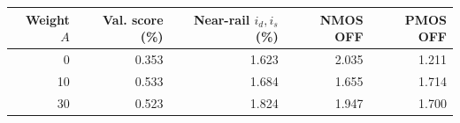 \begin{tabular}{rrrrr}
\toprule
Weight $A$ & Val. score (\%) & Near-rail $i_d,i_s$ (\%) & NMOS OFF & PMOS OFF \\
\midrule
0 & 0.353 & 1.623 & 2.035 & 1.211 \\
10 & 0.533 & 1.684 & 1.655 & 1.714 \\
30 & 0.523 & 1.824 & 1.947 & 1.700 \\
\bottomrule
\end{tabular}
